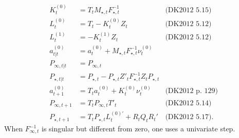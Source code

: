\documentclass{article}
\begin{document}
\begin{align*}
  K^{(0)}_t &= T_tM_{\star,t}F^{-1}_{\star,t}& \mbox{(DK2012 5.15)}\\
  L^{(0)}_t &= T_t - K^{(0)}_tZ_t & \mbox{(DK2012 5.12)}\\
  L^{(1)}_t &= - K^{(1)}_tZ_t & \mbox{(DK2012 5.12)}\\
  a^{(0)}_{t|t} &= a^{(0)}_t + M_{\star,t}F^{-1}_{\star,t}\nu^{(0)}_t\\
  P_{\infty,t|t} &= P_{\infty,t} \\
  P_{\star,t|t} &= P_{\star,t} - P_{\star,t}Z'_t
                  F^{-1}_{\star,t}Z_t P_{\star,t}\\
  a^{(0)}_{t+1} &= T_ta^{(0)}_t + K^{(0)}_t\nu^{(0)}_t & \mbox{(DK2012 
                                                         p. 129)}\\
  P_{\infty,t+ 1} &= T_tP_{\infty,t}T'_t & \mbox{(DK2012 5.14)}\\
  P_{\star, t+1} &= T_tP_{\star,t}L^{(0)'}_t + R_tQ_tR_t' & \mbox{(DK2012 5.17).}
\end{align*}
When $F^{-1}_{\infty,t}$ is singular but different from zero, one uses
a univariate step.
\end{document}
